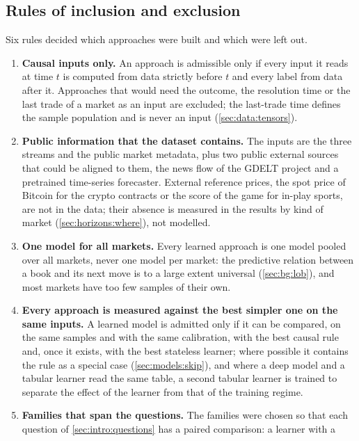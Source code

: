 \subsection{Rules of inclusion and exclusion}
\label{sec:meth:rules}

Six rules decided which approaches were built and which were left out.

\begin{enumerate}[nosep]
  \item \textbf{Causal inputs only.}  An approach is admissible only if every input it
  reads at time $t$ is computed from data strictly before $t$ and every label from data
  after it.  Approaches that would need the outcome, the resolution time or the last trade
  of a market as an input are excluded; the last-trade time defines the sample population
  and is never an input (\cref{sec:data:tensors}).
  \item \textbf{Public information that the dataset contains.}  The inputs are the three
  streams and the public market metadata, plus two public external sources that could be
  aligned to them, the news flow of the GDELT project and a pretrained time-series
  forecaster.  External reference prices, the spot price of Bitcoin for the crypto
  contracts or the score of the game for in-play sports, are not in the data; their
  absence is measured in the results by kind of market (\cref{sec:horizons:where}), not
  modelled.
  \item \textbf{One model for all markets.}  Every learned approach is one model pooled
  over all markets, never one model per market: the predictive relation between a book
  and its next move is to a large extent universal (\cref{sec:bg:lob}), and most markets
  have too few samples of their own.
  \item \textbf{Every approach is measured against the best simpler one on the same
  inputs.}  A learned model is admitted only if it can be compared, on the same samples
  and with the same calibration, with the best causal rule and, once it exists, with the
  best stateless learner; where possible it contains the rule as a special case
  (\cref{sec:models:skip}), and where a deep model and a tabular learner read the same
  table, a second tabular learner is trained to separate the effect of the learner from
  that of the training regime.
  \item \textbf{Families that span the questions.}  The families were chosen so that each
  question of \cref{sec:intro:questions} has a paired comparison: a learner with a

\end{enumerate}

